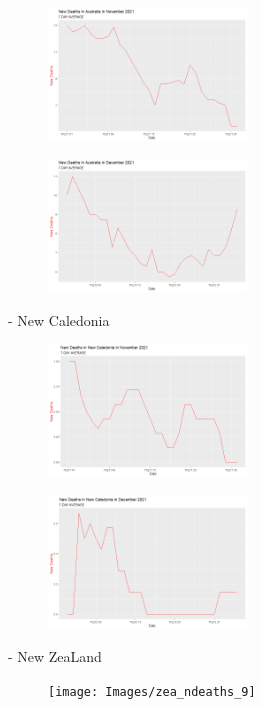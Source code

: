 \documentclass[a4paper]{article}
\theoremstyle{definition}
\begin{document}
\begin{enumerate}[i)]
\begin{enumerate}[1)]
		\begin{figure} [!htp]
  		\centering
  		\includegraphics [width=0.47\textwidth] {Images/aus_ndeaths_11}
		\end{figure}
		
		\begin{figure} [!htp]
  		\centering
  		\includegraphics [width=0.47\textwidth] {Images/aus_ndeaths_12}
		\end{figure}
	- New Caledonia\\
		\begin{figure} [!htp]
  		\centering
  		\includegraphics [width=0.47\textwidth] {Images/cal_ndeaths_3}
		\end{figure}
		
		\begin{figure} [!htp]
  		\centering
  		\includegraphics [width=0.47\textwidth] {Images/cal_ndeaths_4}
		\end{figure}
	- New ZeaLand\\
	   	\begin{figure} [!htp]
  		\centering
  		\texttt{[image: Images/zea\_ndeaths\_9]}
		\end{figure}
		

\end{enumerate}
\end{enumerate}
\end{document}
